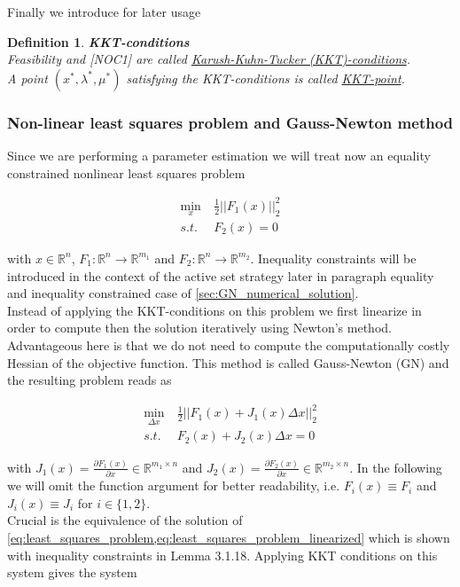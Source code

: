 \documentclass{scrartcl}[12pt, halfparskip]
\numberwithin{equation}{section}
\numberwithin{figure}{section}
\numberwithin{table}{section}
\newtheorem{Definition}{Definition}
\begin{document}
Finally we introduce for later usage 

\begin{Definition} \textbf{KKT-conditions} \\
	Feasibility and [NOC1] are called \underline{Karush-Kuhn-Tucker (KKT)-conditions}. \\
	A point $(x^*, \lambda^*, \mu^*)$ satisfying the KKT-conditions is called \underline{KKT-point}.
\end{Definition}


\subsubsection{Non-linear least squares problem and Gauss-Newton method}
\label{sec:Gauss_Newton}
Since we are performing a parameter estimation we will treat now an equality constrained nonlinear least squares problem

\begin{align}
	\min_x \ & \frac{1}{2}|| F_1(x) ||_2^2 \label{eq:least_squares_problem} \\
	s.t. \ & F_2(x) = 0 \nonumber
\end{align}

with $x \in \mathbb{R}^n$, $F_1: \mathbb{R}^n \rightarrow \mathbb{R}^{m_1}$ and $F_2: \mathbb{R}^n \rightarrow \mathbb{R}^{m_2}$. Inequality constraints will be introduced in the context of the active set strategy later in paragraph equality and inequality constrained case of \cref{sec:GN_numerical_solution}. \\
Instead of applying the KKT-conditions on this problem we first linearize in order to compute then the solution iteratively using Newton's method. Advantageous here is that we do not need to compute the computationally costly Hessian of the objective function. This method is called Gauss-Newton (GN) and the resulting problem reads as

\begin{align}
\min_{\Delta x} \ & \frac{1}{2}|| F_1(x) + J_1(x) \Delta x ||_2^2 \label{eq:least_squares_problem_linearized} \\
s.t. \ & F_2(x) + J_2(x) \Delta x = 0 \nonumber
\end{align}

with $J_1(x) = \frac{\partial F_1(x)}{\partial x} \in \mathbb{R}^{m_1 \times n}$ and $J_2(x) = \frac{\partial F_2(x)}{\partial x} \in \mathbb{R}^{m_2 \times n}$. In the following we will omit the function argument for better readability, i.e. $F_i(x) \equiv F_i$ and $J_i(x) \equiv J_i$ for $i \in \{1,2\}$. \\
Crucial is the equivalence of the solution of \cref{eq:least_squares_problem,eq:least_squares_problem_linearized} which is shown with inequality constraints in \cite{diss_bock} Lemma 3.1.18.
Applying KKT conditions on this system gives the system
\end{document}

